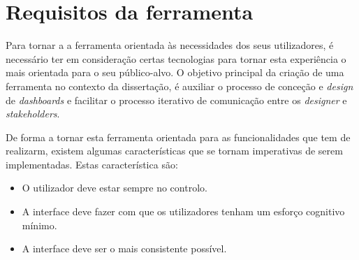 \section{Requisitos da ferramenta} %
\label{sec:requisitos}

Para tornar a a ferramenta orientada às necessidades dos seus utilizadores, é necessário ter em consideração certas tecnologias para tornar esta experiência o mais orientada para o seu público-alvo. O objetivo principal da criação de uma ferramenta no contexto da dissertação, é auxiliar o processo de conceção e \textit{design} de \textit{dashboards} e facilitar o processo iterativo de comunicação entre os \textit{designer} e \textit{stakeholders}.

De forma a tornar esta ferramenta orientada para as funcionalidades que tem de realizarm, existem algumas características que se tornam imperativas de serem implementadas. Estas característica são:

\begin{itemize}
  \item O utilizador deve estar sempre no controlo.
  \item A interface deve fazer com que os utilizadores tenham um esforço cognitivo mínimo.
  \item A interface deve ser o mais consistente possível.
\end{itemize}


